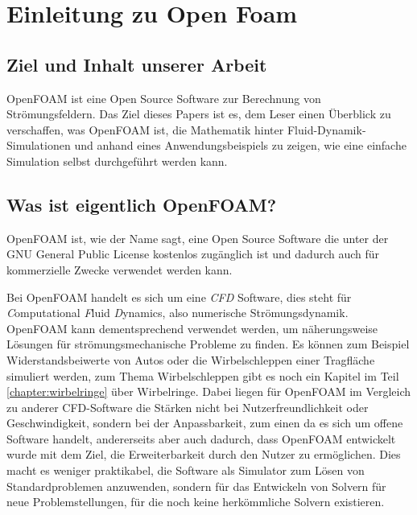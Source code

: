 %
%
%
%
\section{Einleitung zu Open Foam\label{openfoam:section:Einleitung}}

\subsection{Ziel und Inhalt unserer Arbeit}
OpenFOAM ist eine Open Source Software zur Berechnung von Strömungsfeldern. 
Das Ziel dieses Papers ist es, dem Leser einen Überblick zu verschaffen, was OpenFOAM ist, die Mathematik hinter Fluid-Dynamik-Simulationen und anhand eines 
Anwendungsbeispiels zu zeigen, wie eine einfache Simulation selbst durchgeführt werden kann.


\subsection{Was ist eigentlich OpenFOAM?\label{openfoam:section:WasIstOpenFoam}}
OpenFOAM ist, wie der Name sagt, eine Open Source Software die unter der GNU
General Public License kostenlos zugänglich ist und dadurch auch für kommerzielle Zwecke 
verwendet werden kann. 

Bei OpenFOAM handelt es sich um eine \emph{CFD} Software, dies steht für \emph{C}omputational \emph{F}luid \emph{D}ynamics, also numerische Strömungsdynamik.
OpenFOAM kann dementsprechend verwendet werden, um näherungsweise Lösungen für 
strömungsmechanische Probleme zu finden.
Es können zum Beispiel Widerstandsbeiwerte von Autos oder die Wirbelschleppen einer Tragfläche simuliert werden, zum Thema Wirbelschleppen gibt es noch ein Kapitel im Teil \ref{chapter:wirbelringe} über Wirbelringe.
Dabei liegen für OpenFOAM im Vergleich zu anderer CFD-Software die Stärken nicht bei Nutzerfreundlichkeit oder Geschwindigkeit, sondern bei der Anpassbarkeit, zum einen da es sich um offene Software handelt, andererseits aber auch dadurch, dass OpenFOAM entwickelt wurde mit dem Ziel, die Erweiterbarkeit durch den Nutzer zu ermöglichen.
Dies macht es weniger praktikabel, die Software als Simulator zum Lösen von Standardproblemen anzuwenden, sondern für das Entwickeln von Solvern für neue Problemstellungen, für die noch keine herkömmliche Solvern existieren.

